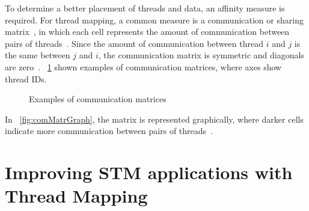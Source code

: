 To determine a better placement of threads and data, an affinity measure is required. For thread mapping, a common measure is a communication or sharing matrix~\cite{Bordage:2018, Mazaheri:2018}, in which each cell represents the amount of communication between pairs of threads~\cite{Sasongko:2019}. Since the amount of communication between thread $i$ and $j$ is the same between $j$ and $i$, the communication matrix is symmetric and diagonals are zero~\cite{Mazaheri:2018}. \figurename~\ref{fig:comMatrExample} shown examples of communication matrices, where axes show thread IDs. 
\begin{figure}[!ht]
	\centering
\hspace*{1cm}
	\caption{Examples of communication matrices}
	\label{fig:comMatrExample}
\end{figure}
In \figurename~\ref{fig:comMatrGraph}, the matrix is represented graphically, where darker cells indicate more communication between pairs of threads~\cite{Diener:2016:2}.

\section{Improving STM applications with Thread Mapping}\label{sec:improvements}

